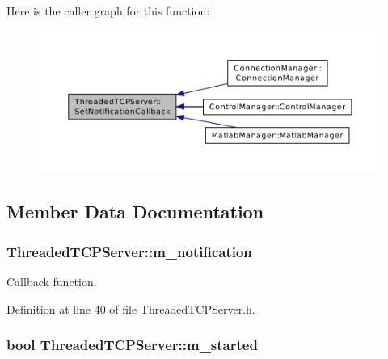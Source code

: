 Here is the caller graph for this function\-:\nopagebreak
\begin{figure}[H]
\begin{center}
\leavevmode
\includegraphics[width=350pt]{class_threaded_t_c_p_server_ac201656ab22b4ad07115d78cf8b7dd89_icgraph}
\end{center}
\end{figure}




\subsection{Member Data Documentation}
\hypertarget{class_threaded_t_c_p_server_acb1fa272e38dbd62673d5279a3e94345}{
\subsubsection[{m\-\_\-notification}]{ Threaded\-T\-C\-P\-Server\-::m\-\_\-notification\hspace{0.3cm}{\ttfamily [private]}}}\label{class_threaded_t_c_p_server_acb1fa272e38dbd62673d5279a3e94345}


Callback function. 



Definition at line 40 of file Threaded\-T\-C\-P\-Server.\-h.

\hypertarget{class_threaded_t_c_p_server_aae68c31d87e830f67907edba35eceec3}{
\subsubsection[{m\-\_\-started}]{\setlength{\rightskip}{0pt plus 5cm}bool Threaded\-T\-C\-P\-Server\-::m\-\_\-started\hspace{0.3cm}{\ttfamily [private]}}}\label{class_threaded_t_c_p_server_aae68c31d87e830f67907edba35eceec3}


